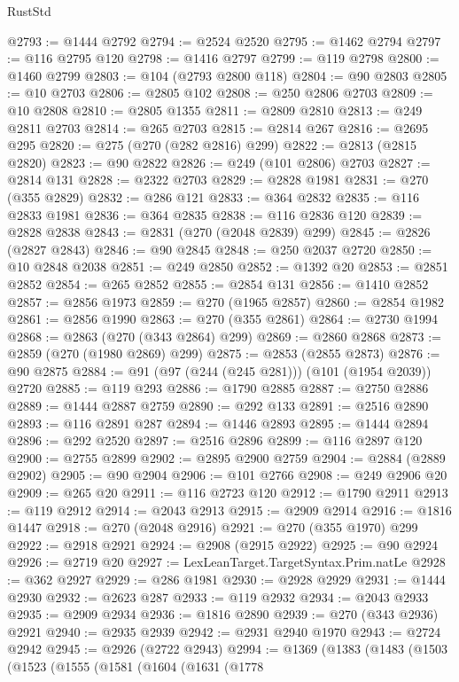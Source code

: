 \begin{lexlean}{RustStd}
\begin{coremodule}
@2793 := @1444 @2792
@2794 := @2524 @2520
@2795 := @1462 @2794
@2797 := @116 @2795 @120
@2798 := @1416 @2797
@2799 := @119 @2798
@2800 := @1460 @2799
@2803 := @104 (@2793 @2800 @118)
@2804 := @90 @2803
@2805 := @10 @2703
@2806 := @2805 @102
@2808 := @250 @2806 @2703
@2809 := @10 @2808
@2810 := @2805 @1355
@2811 := @2809 @2810
@2813 := @249 @2811 @2703
@2814 := @265 @2703
@2815 := @2814 @267
@2816 := @2695 @295
@2820 := @275 (@270 (@282 @2816) @299)
@2822 := @2813 (@2815 @2820)
@2823 := @90 @2822
@2826 := @249 (@101 @2806) @2703
@2827 := @2814 @131
@2828 := @2322 @2703
@2829 := @2828 @1981
@2831 := @270 (@355 @2829)
@2832 := @286 @121
@2833 := @364 @2832
@2835 := @116 @2833 @1981
@2836 := @364 @2835
@2838 := @116 @2836 @120
@2839 := @2828 @2838
@2843 := @2831 (@270 (@2048 @2839) @299)
@2845 := @2826 (@2827 @2843)
@2846 := @90 @2845
@2848 := @250 @2037 @2720
@2850 := @10 @2848 @2038
@2851 := @249 @2850
@2852 := @1392 @20
@2853 := @2851 @2852
@2854 := @265 @2852
@2855 := @2854 @131
@2856 := @1410 @2852
@2857 := @2856 @1973
@2859 := @270 (@1965 @2857)
@2860 := @2854 @1982
@2861 := @2856 @1990
@2863 := @270 (@355 @2861)
@2864 := @2730 @1994
@2868 := @2863 (@270 (@343 @2864) @299)
@2869 := @2860 @2868
@2873 := @2859 (@270 (@1980 @2869) @299)
@2875 := @2853 (@2855 @2873)
@2876 := @90 @2875
@2884 := @91 (@97 (@244 (@245 @281))) (@101 (@1954 @2039)) @2720
@2885 := @119 @293
@2886 := @1790 @2885
@2887 := @2750 @2886
@2889 := @1444 @2887 @2759
@2890 := @292 @133
@2891 := @2516 @2890
@2893 := @116 @2891 @287
@2894 := @1446 @2893
@2895 := @1444 @2894
@2896 := @292 @2520
@2897 := @2516 @2896
@2899 := @116 @2897 @120
@2900 := @2755 @2899
@2902 := @2895 @2900 @2759
@2904 := @2884 (@2889 @2902)
@2905 := @90 @2904
@2906 := @101 @2766
@2908 := @249 @2906 @20
@2909 := @265 @20
@2911 := @116 @2723 @120
@2912 := @1790 @2911
@2913 := @119 @2912
@2914 := @2043 @2913
@2915 := @2909 @2914
@2916 := @1816 @1447
@2918 := @270 (@2048 @2916)
@2921 := @270 (@355 @1970) @299
@2922 := @2918 @2921
@2924 := @2908 (@2915 @2922)
@2925 := @90 @2924
@2926 := @2719 @20
@2927 := LexLeanTarget.TargetSyntax.Prim.natLe
@2928 := @362 @2927
@2929 := @286 @1981
@2930 := @2928 @2929
@2931 := @1444 @2930
@2932 := @2623 @287
@2933 := @119 @2932
@2934 := @2043 @2933
@2935 := @2909 @2934
@2936 := @1816 @2890
@2939 := @270 (@343 @2936) @2921
@2940 := @2935 @2939
@2942 := @2931 @2940 @1970
@2943 := @2724 @2942
@2945 := @2926 (@2722 @2943)
@2994 := @1369
    (@1383
      (@1483
        (@1503
          (@1523
            (@1555
              (@1581
                (@1604
                  (@1631
                    (@1778

\end{coremodule}
\end{lexlean}
